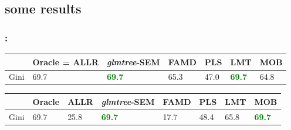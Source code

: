 \documentclass[english,xcolor={rgb,dvipsnames,table,usenames}]{beamer}
\begin{document}
\subsection{some results}

\begin{frame}
\frametitle{\secname: \subsecname}

\begin{table}[t]
\centering
\begin{tabular}{ll|lllll}
 & Oracle = ALLR & \textit{glmtree}-SEM & FAMD & PLS & LMT & MOB \\
\hline
Gini & 69.7 & \textcolor{green}{\textbf{69.7}} & 65.3 & 47.0 & \textcolor{green}{\textbf{69.7}} & 64.8 \\
\end{tabular}
\end{table}

\bigskip

\begin{table}[t]
\centering
\begin{tabular}{ll|llllll}
 & Oracle & ALLR & \textit{glmtree}-SEM & FAMD & PLS & LMT & MOB \\
\hline
Gini & 69.7 & 25.8 & \textcolor{green}{\textbf{69.7}} & 17.7 & 48.4 & 65.8 & \textcolor{green}{\textbf{69.7}} \\
\end{tabular}
\end{table}

\end{frame}



%
%
%
%
%
%
%
%
%
%
%
%
%
%
%
%
\end{document}
